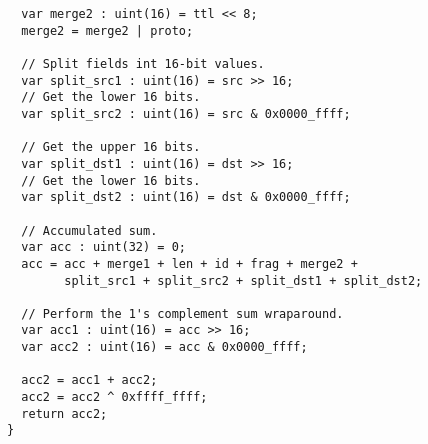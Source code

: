 \begin{lstlisting}
  var merge2 : uint(16) = ttl << 8;
  merge2 = merge2 | proto;

  // Split fields int 16-bit values.
  var split_src1 : uint(16) = src >> 16;
  // Get the lower 16 bits.
  var split_src2 : uint(16) = src & 0x0000_ffff;

  // Get the upper 16 bits.
  var split_dst1 : uint(16) = dst >> 16;
  // Get the lower 16 bits.
  var split_dst2 : uint(16) = dst & 0x0000_ffff;

  // Accumulated sum.
  var acc : uint(32) = 0;
  acc = acc + merge1 + len + id + frag + merge2 +
        split_src1 + split_src2 + split_dst1 + split_dst2;

  // Perform the 1's complement sum wraparound.
  var acc1 : uint(16) = acc >> 16;
  var acc2 : uint(16) = acc & 0x0000_ffff;

  acc2 = acc1 + acc2;
  acc2 = acc2 ^ 0xffff_ffff;
  return acc2;
}
\end{lstlisting}